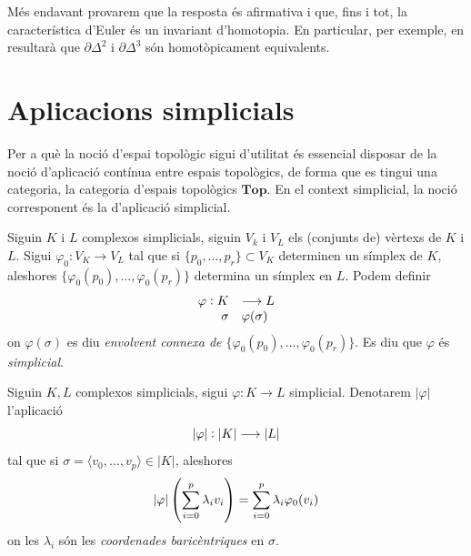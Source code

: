 \documentclass[../main.tex]{subfiles}
\begin{document}
Més endavant provarem que la resposta és afirmativa i que, fins i tot, la característica d'Euler és un invariant d'homotopia. En particular, per exemple, en resultarà que $\partial\Delta^2$ i $\partial\Delta^3$ són homotòpicament equivalents.


\section{Aplicacions simplicials}

Per a què la noció d'espai topològic sigui d'utilitat és essencial disposar de la noció d'aplicació contínua entre espais topològics, de forma que es tingui una categoria, la categoria d'espais topològics $\mathbf{Top}$. En el context simplicial, la noció corresponent és la d'aplicació simplicial.

\begin{defi}
Siguin $K$ i $L$ complexos simplicials, siguin $V_k$ i $V_L$ els (conjunts de) vèrtexs de $K$ i $L$. Sigui $\varphi_0:V_K\rightarrow V_L$ tal que si $\{p_0,\ldots,p_r\}\subset V_K$ determinen un símplex de $K$, aleshores $\{\varphi_0(p_0),\ldots,\varphi_0(p_r)\}$ determina un símplex en $L$. Podem definir
\begin{equation}
    \notag
    \begin{array}{rl}
        \varphi:K & \longrightarrow L \\
        \sigma & \varphi(\sigma)
    \end{array}
\end{equation}
on $\varphi(\sigma)$ es diu \textit{envolvent connexa de $\{\varphi_0(p_0),\ldots,\varphi_0(p_r)\}$}. Es diu que $\varphi$ és \textit{simplicial}.
\end{defi}


\begin{defi}
Siguin $K,L$ complexos simplicials, sigui $\varphi:K\rightarrow L$ simplicial. Denotarem $|\varphi|$ l'aplicació
\begin{equation}
    \notag
    |\varphi|:|K|\longrightarrow|L|
\end{equation}
tal que si $\sigma= \langle v_0,\ldots,v_p\rangle\in |K|$, aleshores
\begin{equation}
    \notag
    |\varphi|\left(\sum_{i=0}^p\lambda_iv_i\right)=\sum_{i=0}^p\lambda_i\varphi_0(v_i)
\end{equation}
on les $\lambda_i$ són les \textit{coordenades baricèntriques} en $\sigma$.
\end{defi}
\end{document}
